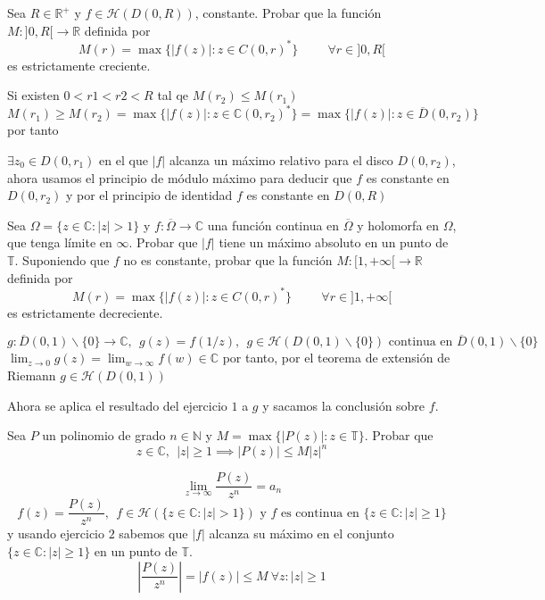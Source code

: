 \begin{ejer}
	Sea $R\in\mathbb{R}^+$ y $f\in\mathcal{H}(D(0,R))$, constante.
	Probar que la función $M:]0,R[\rightarrow\mathbb{R}$ definida por
	$$ M(r) = \max\{ |f(z)| : z\in C(0,r)^{\ast} \} \hspace{1cm} \forall r\in ]0,R[ $$
	es estrictamente creciente.
\end{ejer}

\begin{sol}
Si existen $0<r1<r2<R$ tal qe $M(r_2) \leq M(r_1)$
$$M(r_1) \geq M(r_2) = \max\{ |f(z)| : z\in\mathbb{C}(0,r_2)^{\ast} \} = \max\{ |f(z)| : z\in\overline{D}(0,r_2) \}$$
por tanto

$\exists z_0 \in D(0,r_1)$ en el que $|f|$ alcanza un máximo relativo para el disco $D(0,r_2)$,
ahora usamos el principio de módulo máximo para deducir que 
$f$ es constante en $D(0,r_2)$ y por el principio de identidad
$f$ es constante en $D(0,R)$

\end{sol}

\begin{ejer}
	Sea $\Omega = \{ z\in\mathbb{C} : |z|>1 \}$ y $f:\overline{\Omega}\rightarrow\mathbb{C}$ una función continua en $\overline{\Omega}$ y holomorfa en $\Omega$, que tenga límite en $\infty$. 
	Probar que $|f|$ tiene un máximo absoluto en un punto de $\mathbb{T}$.
	Suponiendo que $f$ no es constante, probar que la función $M:[1,+\infty[\rightarrow\mathbb{R}$ definida por
	$$ M(r) = \max\{ |f(z)| : z\in C(0,r)^{\ast} \}  \hspace{1cm} \forall r\in ]1,+\infty[$$
	es estrictamente decreciente.
\end{ejer}
\begin{sol}
$$g:\overline{D}(0,1)\backslash\{0\} \rightarrow \mathbb{C}, \ \ g(z) = f(1/z), \ \ g\in\mathcal{H}(D(0,1)\backslash\{0\}) \text{ continua en } \overline{D}(0,1)\backslash\{0\}$$
$\lim_{z\rightarrow0} g(z) = \lim_{w\rightarrow\infty} f(w) \in\mathbb{C}$ por tanto, por el teorema de extensión de Riemann
$g\in\mathcal{H}(D(0,1))$

Ahora se aplica el resultado del ejercicio $1$ a $g$ y sacamos la conclusión sobre $f$.
\end{sol}


\begin{ejer}
	Sea $P$ un polinomio de grado $n\in\mathbb{N}$ y $M = \max\{ |P(z)| : z\in\mathbb{T} \}$. Probar que
	$$ z\in\mathbb{C},\ \ |z|\geq 1 \implies |P(z)| \leq M|z|^n $$
\end{ejer}
\begin{sol}
$$\lim_{z\rightarrow\infty} \frac{P(z)}{z^n} = a_n$$
$$f(z) = \frac{P(z)}{z^n}, \ \ f\in\mathcal{H}(\{ z\in\mathbb{C} : |z|>1 \}) \text{ y $f$ es continua en }\{ z\in\mathbb{C} : |z|\geq 1 \}$$
y usando ejercicio $2$ sabemos que
$|f|$ alcanza su máximo en el conjunto $\{ z\in\mathbb{C} : |z|\geq 1 \}$ en un punto de $\mathbb{T}$.
$$\left| \frac{P(z)}{z^n} \right| = |f(z)| \leq M \ \forall z : |z|\geq 1$$
\end{sol}


